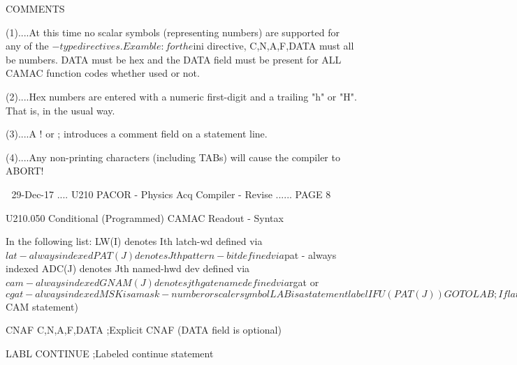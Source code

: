  
                                    COMMENTS
 
   (1)....At  this time no scalar symbols (representing numbers) are supported
          for any of the $-type directives. Examble: for the  $ini  directive,
          C,N,A,F,DATA  must  all  be  numbers.  DATA must be hex and the DATA
          field must be present for ALL CAMAC function codes whether  used  or
          not.
 
   (2)....Hex  numbers  are  entered with a numeric first-digit and a trailing
          "h" or "H". That is, in the usual way.
 
   (3)....A ! or ; introduces a comment field on a statement line.
 
   (4)....Any   non-printing   characters  (including  TABs)  will  cause  the
          compiler to ABORT!
 
    
   29-Dec-17 .... U210  PACOR -  Physics Acq Compiler - Revise ...... PAGE   8
 
 
 
   U210.050  Conditional (Programmed) CAMAC Readout - Syntax
 
   In the following list:
   LW(I)   denotes Ith latch-wd      defined via $lat      - always indexed
   PAT(J)  denotes Jth pattern-bit   defined via $pat      - always indexed
   ADC(J)  denotes Jth named-hwd dev defined via $cam      - always indexed
   GNAM(J) denotes jth gatename defined via $rgat or $cgat - always indexed
   MSK is a mask - number or scaler symbol
   LAB is a statement label
 
   IFU(PAT(J))GOTO LAB    ;If latch-bit implied by PAT(J) not set,  GOTO LAB
   IFS(PAT(J))GOTO LAB    ;If latch-bit implied by PAT(J)  is set,  GOTO LAB
 
   IFT(GNAM(J))GOTO LAB   ;If raw or calculated gate GNAM(J) true,  GOTO LAB
   IFF(GNAM(J))GOTO LAB   ;If raw or calculated gate GNAM(J) false, GOTO LAB
 
   IFA(LW(I),MSK)GOTO LAB ;If any bits set in MSK are set in LW(I), GOTO LAB
   IFN(LW(I),MSK)GOTO LAB ;If no  bits set in MSK are set in LW(I), GOTO LAB
 
   GOTO LAB               ;Unconditional GOTO LAB
 
   READ ADC(J)            ;Read ADC(J) (C,N,A,F defined in $CAM statement)
 
   CNAF C,N,A,F,DATA      ;Explicit CNAF (DATA field is optional)
 
   LABL  CONTINUE         ;Labeled continue statement
 
